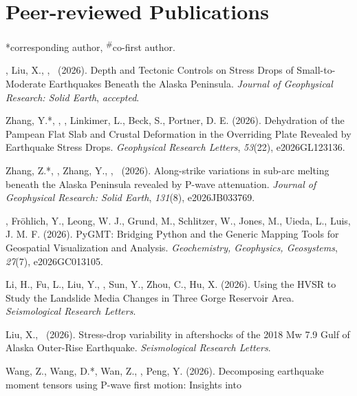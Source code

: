 \section{Peer-reviewed Publications}
\newcommand{\Revision}{\emph{under revision}}
\newcommand{\CS}{*} %
\newcommand{\CF}{\textsuperscript{\#}} %

\CS corresponding author, \CF co-first author.
\begin{etaremune}
\item \Me\CS, Liu, X., \FWang, \SWei\ (2026).
    Depth and Tectonic Controls on Stress Drops of Small-to-Moderate Earthquakes Beneath the Alaska Peninsula.
    \emph{Journal of Geophysical Research: Solid Earth}, \emph{accepted}.
\item Zhang, Y.\CS, \SWei\CS, \Me, Linkimer, L., Beck, S., Portner, D. E. (2026).
    Dehydration of the Pampean Flat Slab and Crustal Deformation in the Overriding Plate Revealed by Earthquake Stress Drops.
    \emph{Geophysical Research Letters}, \emph{53}(22), e2026GL123136.
\item Zhang, Z.\CS, \SWei\CS, Zhang, Y., \FWang, \Me\ (2026).
    Along-strike variations in sub-arc melting beneath the Alaska Peninsula revealed by P-wave attenuation.
    \emph{Journal of Geophysical Research: Solid Earth}, \emph{131}(8), e2026JB033769.
\item
    \Me\CS, Fröhlich, Y., Leong, W. J., Grund, M., Schlitzer, W., Jones, M., Uieda, L., Luis, J. M. F. (2026).
    PyGMT: Bridging Python and the Generic Mapping Tools for Geospatial Visualization and Analysis.
    \emph{Geochemistry, Geophysics, Geosystems}, \emph{27}(7), e2026GC013105.
\item Li, H., Fu, L., Liu, Y., \Me, Sun, Y., Zhou, C., Hu, X. (2026).
    Using the HVSR to Study the Landslide Media Changes in Three Gorge Reservoir Area.
    \emph{Seismological Research Letters}.
\item Liu, X., \Me\CS\ (2026).
    Stress-drop variability in aftershocks of the 2018 Mw 7.9 Gulf of Alaska Outer-Rise Earthquake.
    \emph{Seismological Research Letters}.
\item Wang, Z., Wang, D.\CS, Wan, Z., \Me\CS, Peng, Y. (2026).
    Decomposing earthquake moment tensors using P-wave first motion: Insights into

\end{etaremune}
